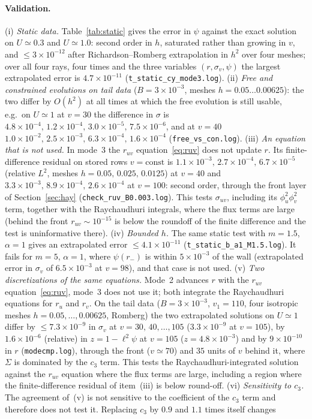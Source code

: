 \documentclass[11pt]{article}
\begin{document}
\paragraph{Validation.} (i) \emph{Static data.} Table~\ref{tab:static} gives the error in $\psi$ against the exact solution on $U\simeq0.3$ and $U\simeq1.0$: second order in $h$, saturated rather than growing in $v$, and $\le3\times10^{-12}$ after Richardson--Romberg extrapolation in $h^{2}$ over four meshes; over all four rays, four times and the three variables $(r,\sigma_v,\psi)$ the largest extrapolated error is $4.7\times10^{-11}$ (\texttt{t\_static\_cy\_mode3.log}). (ii) \emph{Free and constrained evolutions on tail data} ($B=3\times10^{-3}$, meshes $h=0.05\ldots0.00625$): the two differ by $O(h^{2})$ at all times at which the free evolution is still usable, e.g.\ on $U\simeq1$ at $v=30$ the difference in $\sigma$ is $4.8\times10^{-4},\,1.2\times10^{-4},\,3.0\times10^{-5},\,7.5\times10^{-6}$, and at $v=40$ $1.0\times10^{-2},\,2.5\times10^{-3},\,6.3\times10^{-4},\,1.6\times10^{-4}$ (\texttt{free\_vs\_con.log}). (iii) \emph{An equation that is not used.} In mode~3 the $r_{uv}$ equation~\eqref{eq:ruv} does not update $r$. Its finite-difference residual on stored rows $v=\mathrm{const}$ is $1.1\times10^{-3},\,2.7\times10^{-4},\,6.7\times10^{-5}$ (relative $L^2$, meshes $h=0.05,\,0.025,\,0.0125$) at $v=40$ and $3.3\times10^{-3},\,8.9\times10^{-4},\,2.6\times10^{-4}$ at $v=100$: second order, through the front layer of Section~\ref{sec:hay} (\texttt{check\_ruv\_B0.003.log}). This tests $\sigma_{uv}$, including its $\phi_u^{2}\phi_v^{2}$ term, together with the Raychaudhuri integrals, where the flux terms are large (behind the front $r_{uv}\sim10^{-15}$ is below the roundoff of the finite difference and the test is uninformative there). (iv) \emph{Bounded $h$.} The same static test with $m=1.5$, $\alpha=1$ gives an extrapolated error $\le4.1\times10^{-11}$ (\texttt{t\_static\_b\_a1\_M1.5.log}). It fails for $m=5$, $\alpha=1$, where $\psi(r_-)$ is within $5\times10^{-3}$ of the wall (extrapolated error in $\sigma_v$ of $6.5\times10^{-3}$ at $v=98$), and that case is not used. (v) \emph{Two discretizations of the same equations.} Mode~2 advances $r$ with the $r_{uv}$ equation~\eqref{eq:ruv}, mode~3 does not use it; both integrate the Raychaudhuri equations for $r_u$ and $r_v$. On the tail data ($B=3\times10^{-3}$, $v_1=110$, four isotropic meshes $h=0.05,\ldots,0.00625$, Romberg) the two extrapolated solutions on $U\simeq1$ differ by $\le7.3\times10^{-9}$ in $\sigma_v$ at $v=30,\,40,\ldots,105$ ($3.3\times10^{-9}$ at $v=105$), by $1.6\times10^{-6}$ (relative) in $z=1-\ell^{2}\psi$ at $v=105$ ($z=4.8\times10^{-3}$) and by $9\times10^{-10}$ in $r$ (\texttt{modecmp.log}), through the front ($v\simeq70$) and $35$ units of $v$ behind it, where $\Sigma$ is dominated by the $c_3$ term. This tests the Raychaudhuri-integrated solution against the $r_{uv}$ equation where the flux terms are large, including a region where the finite-difference residual of item~(iii) is below round-off. (vi) \emph{Sensitivity to $c_3$.} The agreement of~(v) is not sensitive to the coefficient of the $c_3$ term and therefore does not test it. Replacing $c_3$ by $0.9$ and $1.1$ times itself changes 
\end{document}
